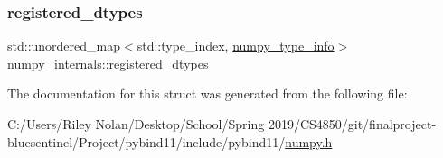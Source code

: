 \subsubsection{\texorpdfstring{registered\_dtypes}{registered\_dtypes}}
{\footnotesize\ttfamily std\+::unordered\+\_\+map$<$std\+::type\+\_\+index, \mbox{\hyperlink{structnumpy__type__info}{numpy\+\_\+type\+\_\+info}}$>$ numpy\+\_\+internals\+::registered\+\_\+dtypes}



The documentation for this struct was generated from the following file\+:\begin{DoxyCompactItemize}
\item 
C\+:/\+Users/\+Riley Nolan/\+Desktop/\+School/\+Spring 2019/\+C\+S4850/git/finalproject-\/bluesentinel/\+Project/pybind11/include/pybind11/\mbox{\hyperlink{numpy_8h}{numpy.\+h}}\end{DoxyCompactItemize}
